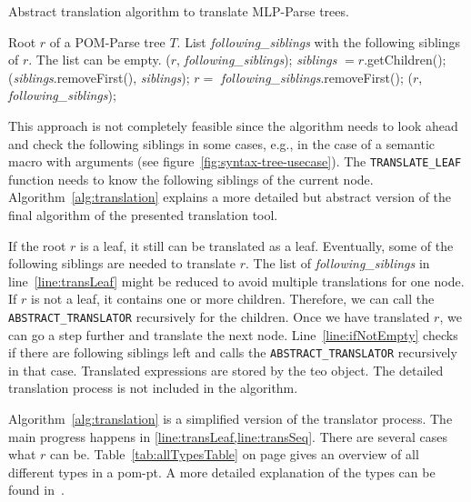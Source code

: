 \begin{algorithm}[H]
\caption{Abstract translation algorithm to translate MLP-Parse trees.}\label{alg:translation}
	\begin{algorithmic}[1]
	\Require Root $r$ of a POM-Parse tree $T$. List \textit{following\_siblings} with the following siblings of $r$. The list can be empty.
		($r$, \textit{following\_siblings});\label{line:transLeaf}
	\Else
		\State \textit{siblings} $ = r$.getChildren(); 
		(\textit{siblings}.removeFirst(), \textit{siblings});\label{line:transSeq}
	\EndIf
	\label{line:ifNotEmpty}
		\State $r =$ \textit{following\_siblings}.removeFirst();
		($r$, \textit{following\_siblings});
	\EndIf
	\EndProcedure
	\end{algorithmic}
\end{algorithm}
\vspace{-20px}

This approach is not completely feasible since the algorithm needs to look ahead and check the following siblings in some cases, e.g., in the case of a semantic macro with arguments (see figure~\ref{fig:syntax-tree-usecase}). The {\footnotesize \verb|TRANSLATE_LEAF|} function needs to know the following siblings of the current node. Algorithm~\ref{alg:translation} explains a more detailed but abstract version of the final algorithm of the presented translation tool. 

If the root $r$ is a leaf, it still can be translated as a leaf. Eventually, some of the following siblings are needed to translate $r$. The list of \textit{following\_siblings} in line~\ref{line:transLeaf} might be reduced to avoid multiple translations for one node. If $r$ is not a leaf, it contains one or more children. Therefore, we can call the {\footnotesize \verb|ABSTRACT_TRANSLATOR|} recursively for the children. Once we have translated $r$, we can go a step further and translate the next node. Line~\ref{line:ifNotEmpty} checks if there are following siblings left and calls the {\footnotesize \verb|ABSTRACT_TRANSLATOR|} recursively in that case. Translated expressions are stored by the \gls*{teo} object. The detailed translation process is not included in the algorithm.

Algorithm~\ref{alg:translation} is a simplified version of the translator process. The main progress happens in \cref{line:transLeaf,line:transSeq}. There are several cases what $r$ can be. Table~\ref{tab:allTypesTable} on page \pageref{tab:allTypesTable} gives an overview of all different types in a \gls*{pom-pt}. A more detailed explanation of the types can be found in~\parencite{POM-Tagger}.

